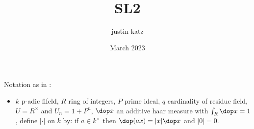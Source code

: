 \documentclass{article}
\title{SL2}
\author{justin katz}
\date{March 2023}
\begin{document}
Notation as in \cite{sallyFourierTransformOrbital1983}:
\begin{itemize}
    \item $k$ p-adic fifeld, $R$ ring of integers, $P$ prime ideal, $q$ cardinality of residue field, $U = R^\times$ and $U_n = 1 + P^n$, $\dop x$ an additive haar measure with $\int_R \dop x =1$, define $|\cdot|$ on $k$ by: if $a\in k^\times$ then $\dop(ax) = |x| \dop x$ and $|0|=0$. 
\end{itemize}



\end{document}
